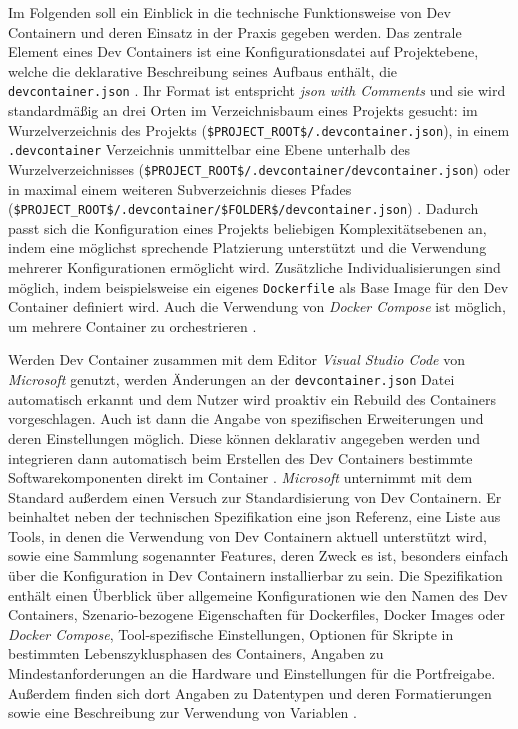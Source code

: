Im Folgenden soll ein Einblick in die technische Funktionsweise von Dev Containern und deren Einsatz in der Praxis gegeben werden. Das zentrale Element eines Dev Containers ist eine Konfigurationsdatei auf Projektebene, welche die deklarative Beschreibung seines Aufbaus enthält, die \texttt{devcontainer.json} \cite{202:Maximizing-Efficiency-with-Dev-Containers}. Ihr Format ist entspricht \textit{\Gls{json} with Comments} und sie wird standardmäßig an drei Orten im Verzeichnisbaum eines Projekts gesucht: im Wurzelverzeichnis des Projekts (\texttt{\$PROJECT\_ROOT\$/.devcontainer.json}), in einem \texttt{.devcontainer} Verzeichnis unmittelbar eine Ebene unterhalb des Wurzelverzeichnisses (\texttt{\$PROJECT\_ROOT\$/.devcontainer/devcontainer.json}) oder in maximal einem weiteren Subverzeichnis dieses Pfades (\texttt{\$PROJECT\_ROOT\$/.devcontainer/\$FOLDER\$/devcontainer.json}) \cite{204:Development-Containers-Simplified,303:Introduction-to-DevContainers,305:Using-DevContainers-in-JetBrains-IDEs}. Dadurch passt sich die Konfiguration eines Projekts beliebigen Komplexitätsebenen an, indem eine möglichst sprechende Platzierung unterstützt und die Verwendung mehrerer Konfigurationen ermöglicht wird. Zusätzliche Individualisierungen sind möglich, indem beispielsweise ein eigenes \texttt{Dockerfile} als Base Image für den Dev Container definiert wird. Auch die Verwendung von \textit{Docker Compose} ist möglich, um mehrere Container zu orchestrieren \cite{202:Maximizing-Efficiency-with-Dev-Containers}.

Werden Dev Container zusammen mit dem Editor \textit{Visual Studio Code} von \textit{Microsoft} genutzt, werden Änderungen an der \texttt{devcontainer.json} Datei automatisch erkannt und dem Nutzer wird proaktiv ein Rebuild des Containers vorgeschlagen. Auch ist dann die Angabe von spezifischen Erweiterungen und deren Einstellungen möglich. Diese können deklarativ angegeben werden und integrieren dann automatisch beim Erstellen des Dev Containers bestimmte Softwarekomponenten direkt im Container \cite{201:How-to-develop-with-Dev-Containers}. \textit{Microsoft} unternimmt mit dem  Standard außerdem einen Versuch zur Standardisierung von Dev Containern. Er beinhaltet neben der technischen Spezifikation eine \Gls{json} Referenz, eine Liste aus Tools, in denen die Verwendung von Dev Containern aktuell unterstützt wird, sowie eine Sammlung sogenannter Features, deren Zweck es ist, besonders einfach über die Konfiguration in Dev Containern installierbar zu sein. Die Spezifikation enthält einen Überblick über allgemeine Konfigurationen wie den Namen des Dev Containers, Szenario-bezogene Eigenschaften für Dockerfiles, Docker Images oder \textit{Docker Compose}, Tool-spezifische Einstellungen, Optionen für Skripte in bestimmten Lebenszyklusphasen des Containers, Angaben zu Mindestanforderungen an die Hardware und Einstellungen für die Portfreigabe. Außerdem finden sich dort Angaben zu Datentypen und deren Formatierungen sowie eine Beschreibung zur Verwendung von Variablen \cite{306:Development-Containers}.

